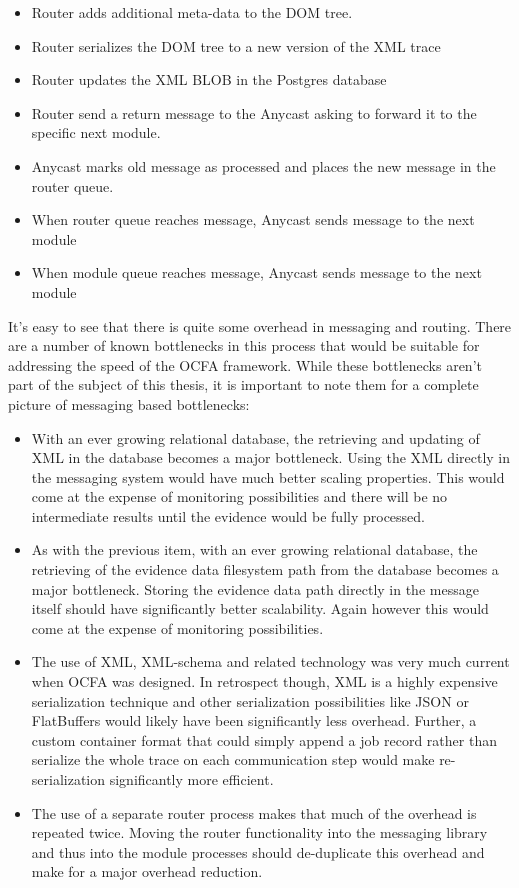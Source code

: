 \begin{itemize}
\item Router adds additional meta-data to the DOM tree.
\item Router serializes the DOM tree to a new version of the XML trace
\item Router updates the XML BLOB in the Postgres database
\item Router send a return message to the Anycast asking to forward it to the specific next module.
\item Anycast marks old message as processed and places the new message in the router queue.
\item When router queue reaches message, Anycast sends message to the next module
\item When module queue reaches message, Anycast sends message to the next module
\end{itemize}
It's easy to see that there is quite some overhead in messaging and routing.
There are a number of known bottlenecks in this process that would be suitable for addressing the speed of the OCFA framework. While these bottlenecks aren't part of the subject of this thesis, it is important to note them for a complete picture of messaging based bottlenecks:
\begin{itemize}
\item With an ever growing relational database, the retrieving and updating of XML in the database becomes a major bottleneck. Using the XML directly in the messaging system would have much better scaling properties. This would come at the expense of monitoring possibilities and there will be no intermediate results until the evidence would be fully processed. 
\item As with the previous item, with an ever growing relational database, the retrieving of the evidence data filesystem path from the database becomes a major bottleneck. Storing the evidence data path directly in the message itself should have significantly better scalability. Again however this would come at the expense of monitoring possibilities.
\item The use of XML, XML-schema and related technology was very much current when OCFA was designed. In retrospect though, XML is a highly expensive serialization technique and other serialization possibilities like JSON or FlatBuffers
would likely have been significantly less overhead. Further, a custom container format that could simply append a job record rather than serialize the whole trace on each communication step would make re-serialization significantly more efficient.
\item The use of a separate router process makes that much of the overhead is repeated twice. Moving the router functionality into the messaging library and thus into the module processes should de-duplicate this overhead and make for a major overhead reduction. 
\end{itemize}
